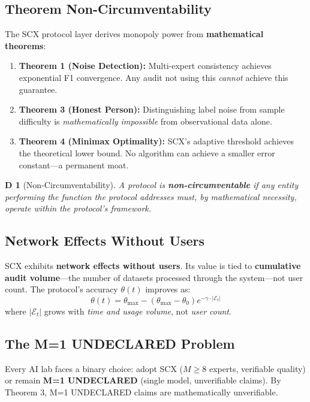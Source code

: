 \documentclass[12pt,a4paper]{article}
\newtheorem{definition}[theorem]Definition
\theoremstyle{remark}
\begin{document}
\subsection{Theorem Non-Circumventability}
The SCX protocol layer derives monopoly power from \textbf{mathematical theorems}:
\begin{enumerate}[label=(\arabic*), leftmargin=*]
    \item \textbf{Theorem 1 (Noise Detection):} Multi-expert consistency achieves exponential F1 convergence. Any audit not using this \textit{cannot} achieve this guarantee.
    \item \textbf{Theorem 3 (Honest Person):} Distinguishing label noise from sample difficulty is \textit{mathematically impossible} from observational data alone.
    \item \textbf{Theorem 4 (Minimax Optimality):} SCX's adaptive threshold achieves the theoretical lower bound. No algorithm can achieve a smaller error constant---a permanent moat.
\end{enumerate}

\begin{definition}[Non-Circumventability]
A protocol is \textbf{non-circumventable} if any entity performing the function the protocol addresses \textit{must}, by mathematical necessity, operate within the protocol's framework.
\end{definition}

\subsection{Network Effects Without Users}
SCX exhibits \textbf{network effects without users}. Its value is tied to \textbf{cumulative audit volume}---the number of datasets processed through the system---not user count. The protocol's accuracy \(\theta(t)\) improves as:
\begin{equation}
\theta(t) = \theta_{\max} - (\theta_{\max} - \theta_0) e^{-\gamma \cdot |\mathcal{E}_t|}
\end{equation}
where \(|\mathcal{E}_t|\) grows with \textit{time and usage volume}, not \textit{user count}.

\subsection{The M=1 UNDECLARED Problem}
Every AI lab faces a binary choice: adopt SCX (\(M \geq 8\) experts, verifiable quality) or remain \textbf{M=1 UNDECLARED} (single model, unverifiable claims). By Theorem 3, M=1 UNDECLARED claims are mathematically unverifiable.
\end{document}
